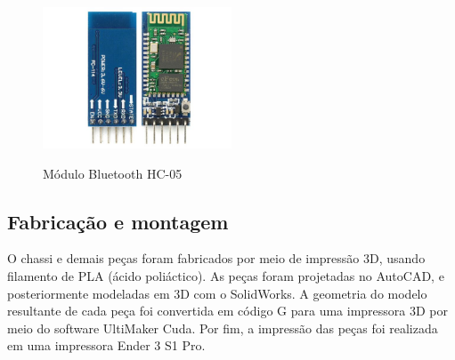 \begin{figure}[htb]
	\centering
	\includegraphics[width=0.5\textwidth]{figures/hc_05}
	\caption{Módulo Bluetooth HC-05}
	\label{fig:hc_05}
	\cite{hc05_image}
\end{figure}

\subsection{Fabricação e montagem}
O chassi e demais peças foram fabricados por meio de impressão 3D, usando filamento de PLA (ácido poliáctico). As
peças foram projetadas no AutoCAD, e posteriormente modeladas em 3D com o SolidWorks. A geometria do modelo
resultante de cada peça foi convertida em código G para uma impressora 3D por meio do software UltiMaker Cuda. Por
fim, a impressão das peças foi realizada em uma impressora Ender 3 S1 Pro.






